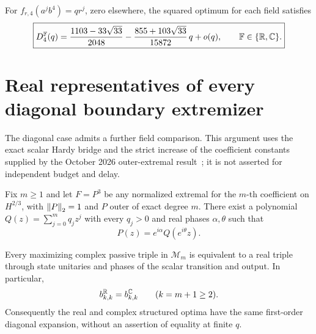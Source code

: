 \begin{theorem}
\label{I:R:thm:four-state-first-correction}
For $f_{r,4}(a^j b^4)=qr^j$, zero elsewhere, the squared optimum for
each field satisfies
\begin{equation}
 \boxed{\displaystyle
 D_4^{\mathbb F}(q)
  =\frac{1103-33\sqrt{33}}{2048}
    -\frac{855+103\sqrt{33}}{15872}\,q+o(q),
 \qquad\mathbb F\in\{\mathbb R,\mathbb C\}.}
 \label{I:R:eq:four-state-optimum}
\end{equation}
\end{theorem}





\section{Real representatives of every diagonal boundary extremizer}
\label{I:R:subsec:real-diagonal-orbits}

The diagonal case admits a further field comparison.  This argument
uses the exact scalar Hardy bridge and the strict increase of the
coefficient constants supplied by the October 2026 outer-extremal
result~\cite{outer2026}; it is not asserted for independent budget and delay.

\begin{lemma}
\label{I:R:lem:positive-Hardy-extremizers}
Fix $m\ge1$ and let $F=P^3$ be any normalized extremal for the
$m$-th coefficient on $H^{2/3}$, with $\left\lVert P\right\rVert_2=1$ and $P$ outer of
exact degree $m$.  There exist a polynomial
$Q(z)=\sum_{j=0}^m q_jz^j$ with every $q_j>0$ and real phases
$\alpha,\theta$ such that
\[
 P(z)=e^{i\alpha}Q(e^{i\theta}z).
\]
\end{lemma}


\begin{proposition}
\label{I:R:prop:real-diagonal-boundary-models}
Every maximizing complex passive triple in $\mathcal M_m$ is equivalent
to a real triple through state unitaries and phases of the scalar
transition and output.  In particular,
\[
 b_{k,k}^{\mathbb R}=b_{k,k}^{\mathbb C}\qquad(k=m+1\ge2).
\]
Consequently the real and complex structured optima have the same
first-order diagonal expansion, without an assertion of equality at
finite $q$.
\end{proposition}


